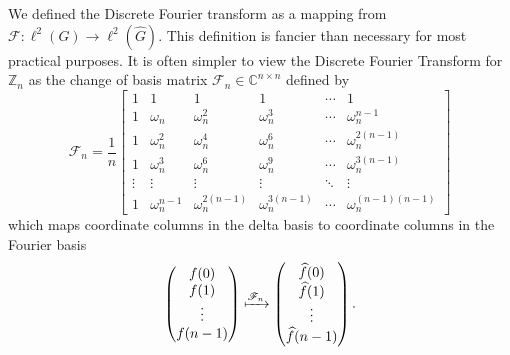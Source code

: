\documentclass[12pt]{article}
\newcommand{\C}{\mathbb{C}}
\begin{document}
We defined the Discrete Fourier transform as a mapping from $\mathscr{F}:\ell^2(G) \to \ell^2(\widehat{G})$.
This definition is fancier than necessary for most practical purposes.
It is often simpler to view the Discrete Fourier Transform for $\mathbb{Z}_n$ as the change of basis matrix $\mathscr{F}_n \in \C^{n\times n}$ defined by
\[
    \mathscr{F}_n
    =
    \frac{1}{n}
    \begin{bmatrix}
        1      & 1              & 1                 & 1                 & \cdots & 1                     \\
        1      & \omega_n       & \omega_n^2        & \omega_n^3        & \cdots & \omega_n^{n-1}        \\
        1      & \omega_n^2     & \omega_n^4        & \omega_n^6        & \cdots & \omega_n^{2(n-1)}     \\
        1      & \omega_n^3     & \omega_n^6        & \omega_n^9        & \cdots & \omega_n^{3(n-1)}     \\
        \vdots & \vdots         & \vdots            & \vdots            & \ddots & \vdots                \\
        1      & \omega_n^{n-1} & \omega_n^{2(n-1)} & \omega_n^{3(n-1)} & \cdots & \omega_n^{(n-1)(n-1)}
    \end{bmatrix}
\]
which maps coordinate columns in the delta basis to coordinate columns in the Fourier basis
\[
    \begin{pmatrix}
        f(0)   \\
        f(1)   \\
        \vdots \\
        f(n-1)
    \end{pmatrix}
    \xmapsto{\mathscr{F}_n}
    \begin{pmatrix}
        \widehat{f}(0)   \\
        \widehat{f}(1)   \\
        \vdots           \\
        \widehat{f}(n-1)
    \end{pmatrix}.
\]
\end{document}
